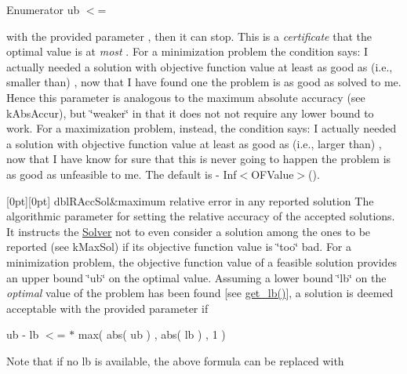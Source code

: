 \begin{DoxyEnumFields}{Enumerator}
ub $<$= 

with the provided parameter , then it can stop. This is a {\itshape certificate} that the optimal value is at {\itshape most} . For a minimization problem the condition says\+: I actually needed a solution with objective function value at least as good as (i.\+e., smaller than) , now that I have found one the problem is as good as solved to me. Hence this parameter is analogous to the maximum absolute accuracy (see k\+Abs\+Accur), but \char`\"{}weaker\char`\"{} in that it does not not require any lower bound to work. For a maximization problem, instead, the condition says\+: I actually needed a solution with objective function value at least as good as (i.\+e., larger than) , now that I have know for sure that this is never going to happen the problem is as good as unfeasible to me. The default is -\/ Inf$<$\+O\+F\+Value$>$(). \\
\hline

[0pt][0pt]{}\mbox{\label{class_s_m_spp__di__unipi__it_1_1_solver_ace6215148d1e3c41a8844f6d692ee132a61bab778a6490d4bac12da31ce986528}} 
dbl\+R\+Acc\+Sol&maximum relative error in any reported solution The algorithmic parameter for setting the relative accuracy of the accepted solutions. It instructs the \mbox{\hyperlink{class_s_m_spp__di__unipi__it_1_1_solver}{Solver}} not to even consider a solution among the ones to be reported (see k\+Max\+Sol) if its objective function value is \char`\"{}too\char`\"{} bad. For a minimization problem, the objective function value of a feasible solution provides an upper bound \char`\"{}ub\char`\"{} on the optimal value. Assuming a lower bound \char`\"{}lb\char`\"{} on the {\itshape optimal} value of the problem has been found \mbox{[}see \mbox{\hyperlink{class_s_m_spp__di__unipi__it_1_1_solver_a4a4dbe4c2416d531c4619ca94fc07d31}{get\+\_\+lb()}}\mbox{]}, a solution is deemed acceptable with the provided parameter  if

ub -\/ lb $<$=  $\ast$ max( abs( ub ) , abs( lb ) , 1 )

Note that if no lb is available, the above formula can be replaced with


\end{DoxyEnumFields}
